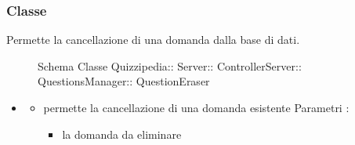 \subsubsection{Classe }
Permette la cancellazione di una domanda dalla base di dati.
\begin{figure}[H]
\centering
\noindent{}
\caption[Schema Classe QuestionEraser]{Schema Classe Quizzipedia:: Server:: ControllerServer:: QuestionsManager:: QuestionEraser}
\end{figure}
\begin{itemize}
\item {}
\begin{itemize}
\item {}
\newline
permette la cancellazione di una domanda esistente
\newline
Parametri :
\begin{itemize}
\item {}
\newline
la domanda da eliminare
\end{itemize}
\end{itemize}
\end{itemize}
